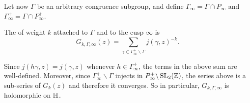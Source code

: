 Let now $\Gamma$ be an arbitrary congruence subgroup, and define $\Gamma_\infty=\Gamma\cap P_\infty$ and $\Gamma_\infty^+=\Gamma\cap P_\infty^+$.

\begin{definition}
  The  of weight $k$ attached to  $\Gamma$ and to the cusp $\infty$ is
\[
G_{k,\Gamma,\infty}(z)=\sum_{\gamma\in \Gamma^+_\infty\backslash\Gamma} j(\gamma,z)^{-k}.
\]
\end{definition}
\begin{remark}
  Since $j(h\gamma,z)=j(\gamma,z)$ whenever $h\in \Gamma_\infty^+$, the terms in the above sum are well-defined. Moreover, since $\Gamma_\infty^+\backslash\Gamma$ injects in $P_\infty^+\backslash\operatorname{SL}_2(\mathbb{Z})$, the series above is a sub-series of $G_k(z)$ and therefore it converges. So in particular, $G_{k,\Gamma,\infty}$ is holomorphic on $\mathbb{H}$.
\end{remark}


